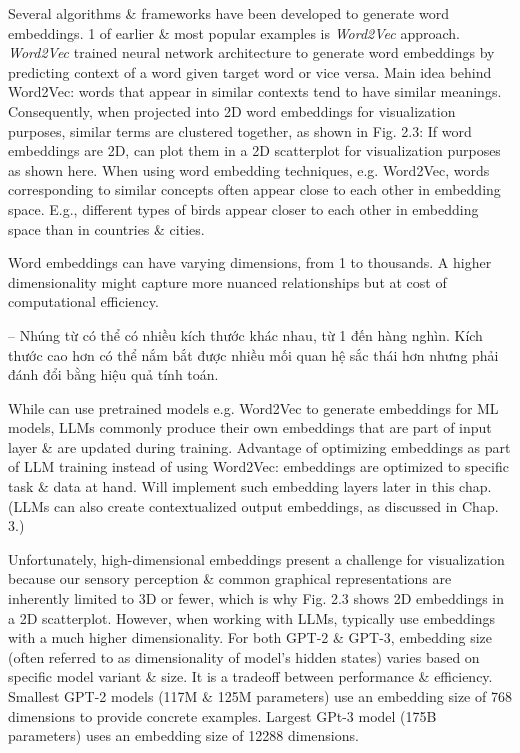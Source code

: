 \documentclass{article}
\begin{document}
\begin{itemize}
\begin{itemize}
		Several algorithms \& frameworks have been developed to generate word embeddings. 1 of earlier \& most popular examples is {\it Word2Vec} approach. {\it Word2Vec} trained neural network architecture to generate word embeddings by predicting context of a word given target word or vice versa. Main idea behind Word2Vec: words that appear in similar contexts tend to have similar meanings. Consequently, when projected into 2D word embeddings for visualization purposes, similar terms are clustered together, as shown in {\sf Fig. 2.3: If word embeddings are 2D, can plot them in a 2D scatterplot for visualization purposes as shown here. When using word embedding techniques, e.g. Word2Vec, words corresponding to similar concepts often appear close to each other in embedding space. E.g., different types of birds appear closer to each other in embedding space than in countries \& cities.}
		
		Word embeddings can have varying dimensions, from 1 to thousands. A higher dimensionality might capture more nuanced relationships but at cost of computational efficiency.
		
		-- Nhúng từ có thể có nhiều kích thước khác nhau, từ 1 đến hàng nghìn. Kích thước cao hơn có thể nắm bắt được nhiều mối quan hệ sắc thái hơn nhưng phải đánh đổi bằng hiệu quả tính toán.
		
		While can use pretrained models e.g. Word2Vec to generate embeddings for ML models, LLMs commonly produce their own embeddings that are part of input layer \& are updated during training. Advantage of optimizing embeddings as part of LLM training instead of using Word2Vec: embeddings are optimized to specific task \& data at hand. Will implement such embedding layers later in this chap. (LLMs can also create contextualized output embeddings, as discussed in Chap. 3.)
		
		Unfortunately, high-dimensional embeddings present a challenge for visualization because our sensory perception \& common graphical representations are inherently limited to 3D or fewer, which is why Fig. 2.3 shows 2D embeddings in a 2D scatterplot. However, when working with LLMs, typically use embeddings with a much higher dimensionality. For both GPT-2 \& GPT-3, embedding size (often referred to as dimensionality of model's hidden states) varies based on specific model variant \& size. It is a tradeoff between performance \& efficiency. Smallest GPT-2 models (117M \& 125M parameters) use an embedding size of 768 dimensions to provide concrete examples. Largest GPt-3 model (175B parameters) uses an embedding size of 12288 dimensions.
		

\end{itemize}
\end{itemize}
\end{document}
